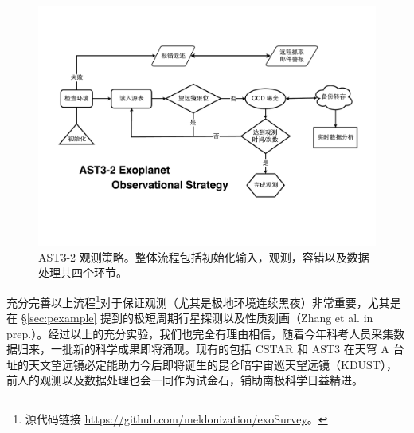 \begin{figure}[t]
\centering
\includegraphics[width=1.0\textwidth]{figures/chapter2/f12_ast3pipeline.pdf}
\caption{AST3-2 观测策略。整体流程包括初始化输入，观测，容错以及数据处理共四个环节。}
\label{fig:ast3obs}
\end{figure}

充分完善以上流程\footnote{源代码链接 \url{https://github.com/meldonization/exoSurvey}。}对于保证观测（尤其是极地环境连续黑夜）非常重要，尤其是在 \S \ref{sec:pexample} 提到的极短周期行星探测以及性质刻画（Zhang et al. in prep.）。经过以上的充分实验，我们也完全有理由相信，随着今年科考人员采集数据归来，一批新的科学成果即将涌现。现有的包括 CSTAR 和 AST3 在天穹 A 台址的天文望远镜必定能助力今后即将诞生的昆仑暗宇宙巡天望远镜（KDUST），前人的观测以及数据处理也会一同作为试金石，铺助南极科学日益精进。


